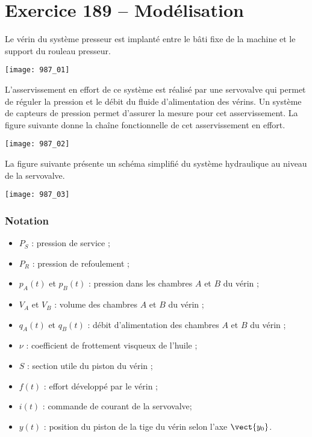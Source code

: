 \section*{Exercice 189 -- Modélisation}
\setcounter{exo}{0}

Le vérin du système presseur est implanté entre le bâti fixe de la machine et le
support du rouleau presseur.

\begin{center}
\texttt{[image: 987\_01]}%
\end{center}

L’asservissement en effort de ce système est réalisé par une servovalve qui permet de
réguler la pression et le débit du fluide d’alimentation des vérins.
Un système de capteurs de pression permet d’assurer la mesure pour cet asservissement.
La figure suivante donne la chaîne fonctionnelle de cet asservissement en effort.

\begin{center}
\texttt{[image: 987\_02]}%
\end{center}

La figure suivante présente un schéma simplifié du système hydraulique au niveau de la
servovalve.

\begin{center}
\texttt{[image: 987\_03]}%
\end{center}


\subsubsection*{Notation}
\begin{itemize}
\item $P_S$ : pression de service ;
\item $P_R$ : pression de refoulement ;
\item $p_A(t)$ et $p_B(t)$ : pression dans les chambres $A$ et $B$ du vérin ;
\item $V_A$ et $V_B$ : volume des chambres $A$ et $B$ du vérin ;
\item $q_A(t)$ et $q_B(t)$ : débit d’alimentation des chambres $A$ et $B$ du vérin ;
\item $ \nu$  : coefficient de frottement visqueux de l’huile ;
\item $S$ : section utile du piston du vérin ;
\item $f(t)$ : effort développé par le vérin ;
\item $i(t)$ : commande de courant de la servovalve;
\item $y(t)$ : position du piston de la tige du vérin selon l’axe $\vect{y_0}$.
\end{itemize}

